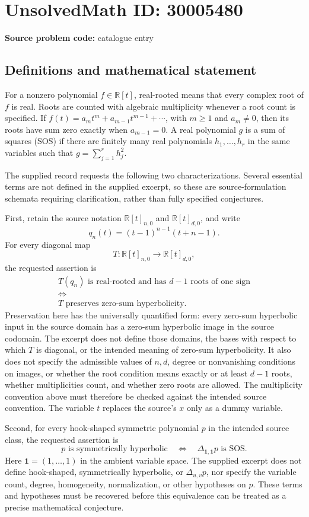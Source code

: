 \documentclass[11pt]{article}
\newcommand{\R}{\mathbb{R}}
\begin{document}
\section*{UnsolvedMath ID: 30005480}
\textbf{Source problem code:} catalogue entry
\subsection{Definitions and mathematical statement}
For a nonzero polynomial \(f\in\R[t]\), real-rooted means that every complex root of \(f\) is real. Roots are counted with algebraic multiplicity whenever a root count is specified. If \(f(t)=a_m t^m+a_{m-1}t^{m-1}+\cdots\), with \(m\geq1\) and \(a_m\ne0\), then its roots have sum zero exactly when \(a_{m-1}=0\). A real polynomial \(g\) is a sum of squares (SOS) if there are finitely many real polynomials \(h_1,\ldots,h_r\) in the same variables such that \(g=\sum_{j=1}^r h_j^2\).

The supplied record requests the following two characterizations. Several essential terms are not defined in the supplied excerpt, so these are source-formulation schemata requiring clarification, rather than fully specified conjectures.

First, retain the source notation \(\R[t]_{n,0}\) and \(\R[t]_{d,0}\), and write
\[
q_n(t)=(t-1)^{n-1}(t+n-1).
\]
For every diagonal map
\[
T:\R[t]_{n,0}\longrightarrow\R[t]_{d,0},
\]
the requested assertion is
\[
\begin{gathered}
T(q_n)\text{ is real-rooted and has }d-1\text{ roots of one sign}
\\[2pt]
\Longleftrightarrow
\\[2pt]
T\text{ preserves zero-sum hyperbolicity}.
\end{gathered}
\]
Preservation here has the universally quantified form: every zero-sum hyperbolic input in the source domain has a zero-sum hyperbolic image in the source codomain. The excerpt does not define those domains, the bases with respect to which \(T\) is diagonal, or the intended meaning of zero-sum hyperbolicity. It also does not specify the admissible values of \(n,d\), degree or nonvanishing conditions on images, or whether the root condition means exactly or at least \(d-1\) roots, whether multiplicities count, and whether zero roots are allowed. The multiplicity convention above must therefore be checked against the intended source convention. The variable \(t\) replaces the source's \(x\) only as a dummy variable.

Second, for every hook-shaped symmetric polynomial \(p\) in the intended source class, the requested assertion is
\[
p\text{ is symmetrically hyperbolic}
\quad\Longleftrightarrow\quad
\Delta_{\mathbf 1,\mathbf 1}p\text{ is SOS}.
\]
Here \(\mathbf 1=(1,\ldots,1)\) in the ambient variable space. The supplied excerpt does not define hook-shaped, symmetrically hyperbolic, or \(\Delta_{u,v}p\), nor specify the variable count, degree, homogeneity, normalization, or other hypotheses on \(p\). These terms and hypotheses must be recovered before this equivalence can be treated as a precise mathematical conjecture.
\end{document}
